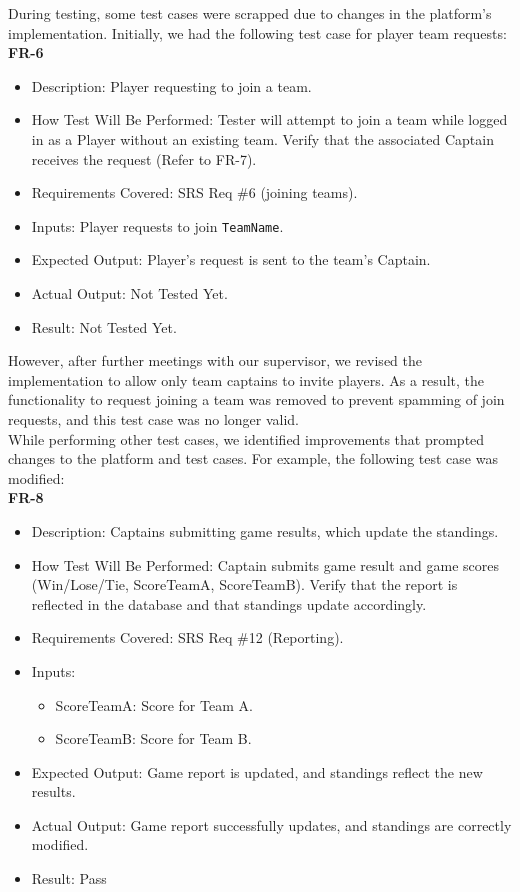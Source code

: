 \documentclass[12pt, titlepage]{article}
\begin{document}
During testing, some test cases were scrapped due to changes in the platform's implementation. Initially, we had the following test case for player team requests:\\

   \textbf{FR-6}  
      \begin{itemize}
          \item Description: Player requesting to join a team.
          \item How Test Will Be Performed: Tester will attempt to join a team while logged in as a Player without an existing team. Verify that the associated Captain receives the request (Refer to FR-7).
          \item Requirements Covered: SRS Req \#6 (joining teams).
          \item Inputs: Player requests to join \texttt{TeamName}.
          \item Expected Output: Player’s request is sent to the team’s Captain.
          \item Actual Output: Not Tested Yet.
          \item Result: Not Tested Yet.
      \end{itemize}

However, after further meetings with our supervisor, we revised the implementation to allow only team captains to invite players. As a result, the functionality to request joining a team was removed to prevent spamming of join requests, and this test case was no longer valid. \\


While performing other test cases, we identified improvements that prompted changes to the platform and test cases. For example, the following test case was modified:\\

 \textbf{FR-8}  
      \begin{itemize}
          \item Description: Captains submitting game results, which update the standings.
          \item How Test Will Be Performed: Captain submits game result and game scores (Win/Lose/Tie, ScoreTeamA, ScoreTeamB). Verify that the report is reflected in the database and that standings update accordingly.
          \item Requirements Covered: SRS Req \#12 (Reporting).
          \item Inputs:  
              \begin{itemize} 
                  \item ScoreTeamA: Score for Team A.  
                  \item ScoreTeamB: Score for Team B.  
              \end{itemize}
          \item Expected Output: Game report is updated, and standings reflect the new results.
          \item Actual Output: Game report successfully updates, and standings are correctly modified.
          \item Result: Pass
      \end{itemize}
\end{document}
